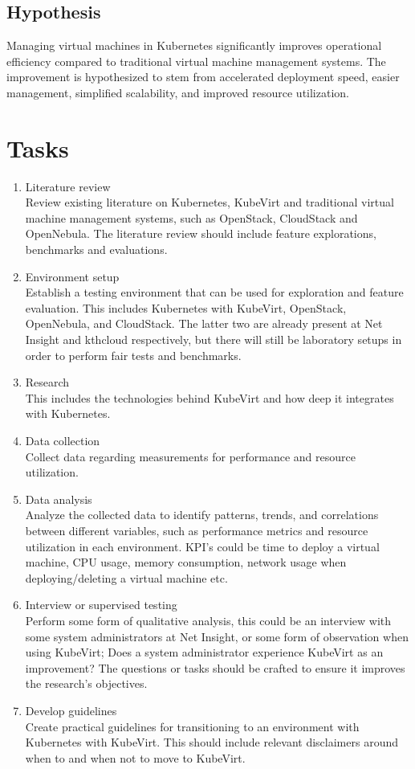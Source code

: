 \documentclass{article}
\begin{document}
\subsection{Hypothesis}
Managing virtual machines in Kubernetes significantly improves operational efficiency compared to traditional virtual machine management systems. The improvement is hypothesized to stem from accelerated deployment speed, easier management, simplified scalability, and improved resource utilization.

\section{Tasks}
\begin{enumerate}
    \item Literature review\\
    Review existing literature on Kubernetes, KubeVirt and traditional virtual machine management systems, such as OpenStack, CloudStack and OpenNebula. The literature review should include feature explorations, benchmarks and evaluations.
    \item Environment setup\\
    Establish a testing environment that can be used for exploration and feature evaluation. This includes Kubernetes with KubeVirt, OpenStack, OpenNebula, and CloudStack. The latter two are already present at Net Insight and kthcloud respectively, but there will still be laboratory setups in order to perform fair tests and benchmarks.  
    \item Research\\
    This includes the technologies behind KubeVirt and how deep it integrates with Kubernetes.
    \item Data collection\\
    Collect data regarding measurements for performance and resource utilization.
    \item Data analysis\\
    Analyze the collected data to identify patterns, trends, and correlations between different variables, such as performance metrics and resource utilization in each environment. KPI’s could be time to deploy a virtual machine, CPU usage, memory consumption, network usage when deploying/deleting a virtual machine etc.
    \item Interview or supervised testing\\
    Perform some form of qualitative analysis, this could be an interview with some system administrators at Net Insight, or some form of observation when using KubeVirt; Does a system administrator experience KubeVirt as an improvement? The questions or tasks should be crafted to ensure it improves the research’s objectives.
    \item Develop guidelines\\
    Create practical guidelines for transitioning to an environment with Kubernetes with KubeVirt. This should include relevant disclaimers around when to and when not to move to KubeVirt. 
\end{enumerate}
\end{document}
